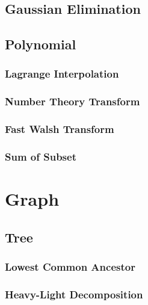 \documentclass[10pt]{article}
\begin{document}
	\subsection{Gaussian Elimination}
	
	
	
	\subsection{Polynomial}
	
	\subsubsection{Lagrange Interpolation}
	
	
	\subsubsection{Number Theory Transform}
	
	
	\subsubsection{Fast Walsh Transform}
	
	
	\subsubsection{Sum of Subset}
	
	
	
	\section{Graph}
	
	\subsection{Tree}
	\subsubsection{Lowest Common Ancestor}
	
	
	\subsubsection{Heavy-Light Decomposition}
	
	
\end{document}
